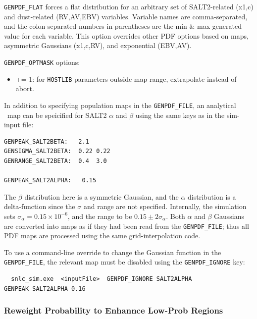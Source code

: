 \documentclass[12pt]{article}
\begin{document}
\clearpage
{\tt GENPDF\_FLAT} forces a flat distribution for an arbitrary
set of SALT2-related (x1,c) and dust-related (RV,AV,EBV) variables.
Variable names are comma-separated, 
and the colon-separated numbers in parentheses are the 
min \& max generated value for each variable.
This option overrides other PDF options based on
maps, asymmetric Gaussians (x1,c,RV), and exponential (EBV,AV).

\medskip\noindent
{\tt GENPDF\_OPTMASK} options:
\begin{itemize}
  \item {+= 1:} for {\tt HOSTLIB} parameters outside map range,
       extrapolate instead of abort. 
\end{itemize}  

\bigskip
In addition to specifying population maps in the {\tt GENPDF\_FILE},
an analytical \AG\ map can be speicified for SALT2 $\alpha$ and $\beta$
using the same keys as in the sim-input file:
%
\begin{Verbatim}
GENPEAK_SALT2BETA:   2.1
GENSIGMA_SALT2BETA:  0.22 0.22
GENRANGE_SALT2BETA:  0.4  3.0 

GENPEAK_SALT2ALPHA:   0.15
\end{Verbatim}
%
The $\beta$ distribution here is a symmetric Gaussian,
and the $\alpha$ distribution is a delta-function since
the $\sigma$ and range are not specified. Internally, the
simulation sets $\sigma_{\alpha} = 0.15\times 10^{-6}$,
and the range to be $0.15\pm 2\sigma_{\alpha}$. Both
$\alpha$ and $\beta$ Gaussians are converted into maps as if they
had been read from the {\tt GENPDF\_FILE}; thus all PDF maps
are processed using the same grid-interpolation code.

\noindent
To use a command-line override to change the Gaussian function in the
{\tt GENPDF\_FILE}, the relevant map must be disabled using the
{\tt GENPDF\_IGNORE} key:
%
\begin{Verbatim}
  snlc_sim.exe  <inputFile>  GENPDF_IGNORE SALT2ALPHA   GENPEAK_SALT2ALPHA 0.16
\end{Verbatim}


\subsubsection{Reweight Probability to Enhannce Low-Prob Regions}
\label{sss:GENPDF_REWGT}

\newcommand{\Pphys}{P_{\rm Phys}}
\newcommand{\Prewgt}{P_{\rm REWGT}}
\end{document}

